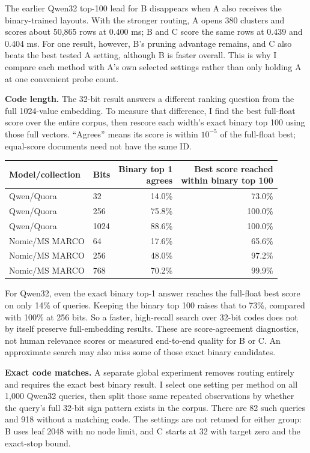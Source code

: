The earlier Qwen32 top-100 lead for B disappears when A also receives the binary-trained layouts. With the stronger routing, A opens 380 clusters and scores about 50,865 rows at 0.400 ms; B and C score the same rows at 0.439 and 0.404 ms. For one result, however, B's pruning advantage remains, and C also beats the best tested A setting, although B is faster overall. This is why I compare each method with A's own selected settings rather than only holding A at one convenient probe count.

\textbf{Code length.}
The 32-bit result answers a different ranking question from the full 1024-value embedding. To measure that difference, I find the best full-float score over the entire corpus, then rescore each width's exact binary top 100 using those full vectors. ``Agrees'' means its score is within $10^{-5}$ of the full-float best; equal-score documents need not have the same ID.

\begin{center}\small
\begin{tabular}{@{}llrr@{}}\toprule
Model/collection & Bits & \shortstack{Binary top 1\\agrees} & \shortstack{Best score reached\\within binary top 100}\\\midrule
Qwen/Quora & 32 & 14.0\% & 73.0\%\\
Qwen/Quora & 256 & 75.8\% & 100.0\%\\
Qwen/Quora & 1024 & 88.6\% & 100.0\%\\
Nomic/MS MARCO & 64 & 17.6\% & 65.6\%\\
Nomic/MS MARCO & 256 & 48.0\% & 97.2\%\\
Nomic/MS MARCO & 768 & 70.2\% & 99.9\%\\\bottomrule
\end{tabular}
\end{center}
For Qwen32, even the exact binary top-1 answer reaches the full-float best score on only 14\% of queries. Keeping the binary top 100 raises that to 73\%, compared with 100\% at 256 bits. So a faster, high-recall search over 32-bit codes does not by itself preserve full-embedding results. These are score-agreement diagnostics, not human relevance scores or measured end-to-end quality for B or C. An approximate search may also miss some of those exact binary candidates.

\textbf{Exact code matches.}
A separate global experiment removes routing entirely and requires the exact best binary result. I select one setting per method on all 1,000 Qwen32 queries, then split those same repeated observations by whether the query's full 32-bit sign pattern exists in the corpus. There are 82 such queries and 918 without a matching code. The settings are not retuned for either group: B uses leaf 2048 with no node limit, and C starts at 32 with target zero and the exact-stop bound.

